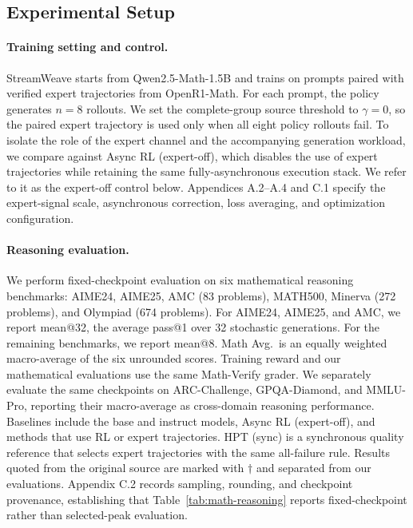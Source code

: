 \documentclass[letterpaper]{article}
\begin{document}
\subsection{Experimental Setup}
\label{sec:experimental-setup}

\paragraph{Training setting and control.}
StreamWeave starts from Qwen2.5-Math-1.5B and trains on prompts paired with verified expert trajectories from OpenR1-Math.
For each prompt, the policy generates $n=8$ rollouts.
We set the complete-group source threshold to $\gamma=0$, so the paired expert trajectory is used only when all eight policy rollouts fail.
To isolate the role of the expert channel and the accompanying generation workload, we compare against Async RL (expert-off), which disables the use of expert trajectories while retaining the same fully-asynchronous execution stack.
We refer to it as the expert-off control below.
Appendices A.2--A.4 and C.1 specify the expert-signal scale, asynchronous correction, loss averaging, and optimization configuration.

\paragraph{Reasoning evaluation.}
We perform fixed-checkpoint evaluation on six mathematical reasoning benchmarks: AIME24, AIME25, AMC (83 problems), MATH500, Minerva (272 problems), and Olympiad (674 problems).
For AIME24, AIME25, and AMC, we report mean@32, the average pass@1 over 32 stochastic generations.
For the remaining benchmarks, we report mean@8.
Math Avg.\ is an equally weighted macro-average of the six unrounded scores.
Training reward and our mathematical evaluations use the same Math-Verify grader.
We separately evaluate the same checkpoints on ARC-Challenge, GPQA-Diamond, and MMLU-Pro, reporting their macro-average as cross-domain reasoning performance.
Baselines include the base and instruct models, Async RL (expert-off), and methods that use RL or expert trajectories.
HPT (sync) is a synchronous quality reference that selects expert trajectories with the same all-failure rule.
Results quoted from the original source are marked with $\dagger$ and separated from our evaluations.
Appendix C.2 records sampling, rounding, and checkpoint provenance, establishing that Table~\ref{tab:math-reasoning} reports fixed-checkpoint rather than selected-peak evaluation.
\end{document}
